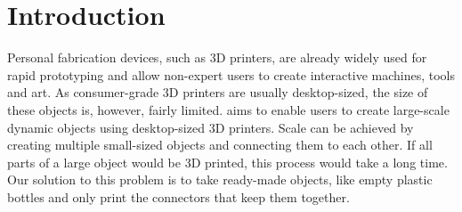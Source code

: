 \chapter{Introduction}\label{ch:introduction}
Personal fabrication devices, such as 3D printers, are already widely used for rapid prototyping and allow non-expert users to create interactive machines, tools and art. As consumer-grade 3D printers are usually desktop-sized, the size of these objects is, however, fairly limited. \trussFabName{} aims to enable users to create large-scale dynamic objects using desktop-sized 3D printers. Scale can be achieved by creating multiple small-sized objects and connecting them to each other. If all parts of a large object would be 3D printed, this process would take a long time. Our solution to this problem is to take ready-made objects, like empty plastic bottles and only print the connectors that keep them together.
